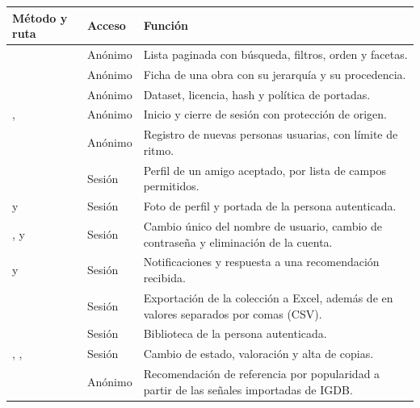 \begin{table}[htbp]
\centering
\tablecompact
\begin{tabularx}{\textwidth}{ | L{0.39\textwidth} | C{0.12\textwidth} | Y | }
    \hline
    \textbf{Método y ruta} & \textbf{Acceso} & \textbf{Función} \\
    \hline
     & Anónimo & Lista paginada con búsqueda, filtros, orden y facetas. \\
    \hline
     & Anónimo & Ficha de una obra con su jerarquía y su procedencia. \\
    \hline
     & Anónimo & Dataset, licencia, hash y política de portadas. \\
    \hline
    ,  & Anónimo & Inicio y cierre de sesión con protección de origen. \\
    \hline
     & Anónimo & Registro de nuevas personas usuarias, con límite de ritmo. \\
    \hline
     & Sesión & Perfil de un amigo aceptado, por lista de campos permitidos. \\
    \hline
     y  & Sesión & Foto de perfil y portada de la persona autenticada. \\
    \hline
    ,  y  & Sesión & Cambio único del nombre de usuario, cambio de contraseña y eliminación de la cuenta. \\
    \hline
     y  & Sesión & Notificaciones y respuesta a una recomendación recibida. \\
    \hline
     & Sesión & Exportación de la colección a Excel, además de en valores separados por comas (CSV). \\
    \hline
     & Sesión & Biblioteca de la persona autenticada. \\
    \hline
    , ,  & Sesión & Cambio de estado, valoración y alta de copias. \\
    \hline
     & Anónimo & Recomendación de referencia por popularidad a partir de las señales importadas de IGDB. \\

\end{tabularx}
\end{table}
